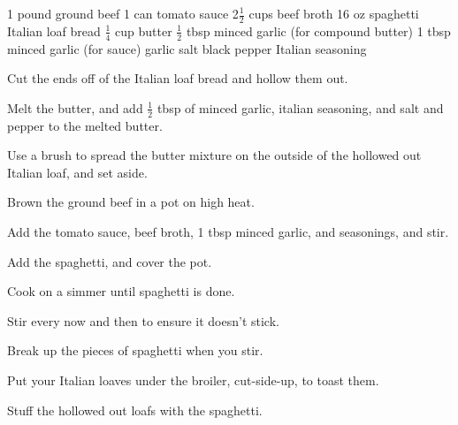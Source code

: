 \dishtype{\main}
\begin{ingreds}
    1 pound ground beef
    1 can tomato sauce
    2$\frac{1}{2}$ cups beef broth
    16 oz spaghetti 
    Italian loaf bread
    $\frac{1}{4}$ cup butter
    $\frac{1}{2}$ tbsp minced garlic (for compound butter)
    1 tbsp minced garlic (for sauce)
    garlic salt
    black pepper
    Italian seasoning
\end{ingreds}
\begin{method}
    Cut the ends off of the Italian loaf bread and hollow them out.\par
    Melt the butter, and add $\frac{1}{2}$ tbsp of minced garlic, italian seasoning, and salt and pepper to the melted butter.\par
    Use a brush to spread the butter mixture on the outside of the hollowed out Italian loaf, and set aside.\par
    Brown the ground beef in a pot on high heat.\par
    Add the tomato sauce, beef broth, 1 tbsp minced garlic, and seasonings, and stir.\par
    Add the spaghetti, and cover the pot.\par
    Cook on a simmer until spaghetti is done.\par
    Stir every now and then to ensure it doesn't stick.\par
    Break up the pieces of spaghetti when you stir.\par
    Put your Italian loaves under the broiler, cut-side-up, to toast them.\par
    Stuff the hollowed out loafs with the spaghetti. 
\end{method}